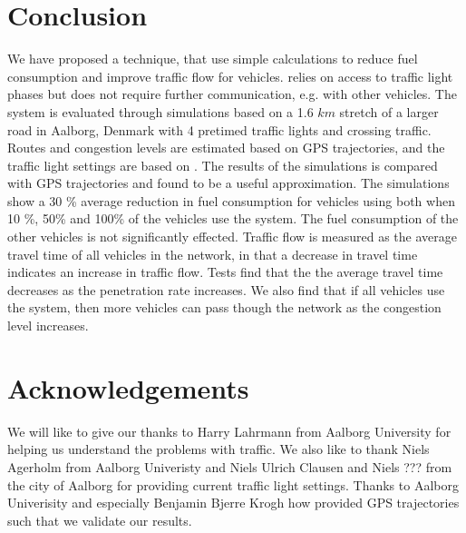 \section{Conclusion}\label{sec:Conclusion}
We have proposed a technique, \tech that use simple calculations to reduce fuel consumption and improve traffic flow for vehicles.
\tech relies on access to traffic light phases but does not require further communication, e.g. with other vehicles.
The system is evaluated through simulations based on a 1.6 $km$ stretch of a larger road in Aalborg, Denmark with 4 pretimed traffic lights and crossing traffic.
Routes and congestion levels are estimated based on GPS trajectories, and the traffic light settings are based on \cite{vejtrafik}.
The results of the simulations is compared with GPS trajectories and found to be a useful approximation.
The simulations show a 30 \% average reduction in fuel consumption for vehicles using \tech both when 10 \%, 50\% and 100\% of the vehicles use the system.
The fuel consumption of the other vehicles is not significantly effected.
Traffic flow is measured as the average travel time of all vehicles in the network, in that a decrease in travel time indicates an increase in traffic flow.
Tests find that the the average travel time decreases as the penetration rate increases. 
We also find that if all vehicles use the system, then more vehicles can pass though the network as the congestion level increases.

\section*{Acknowledgements}
We will like to give our thanks to Harry Lahrmann from Aalborg University for helping us understand the problems with traffic.
We also like to thank Niels Agerholm from Aalborg Univeristy and Niels Ulrich Clausen and Niels ??? from the city of Aalborg for providing current traffic light settings. %
Thanks to Aalborg Univerisity and especially Benjamin Bjerre Krogh how provided GPS trajectories such that we validate our results.


